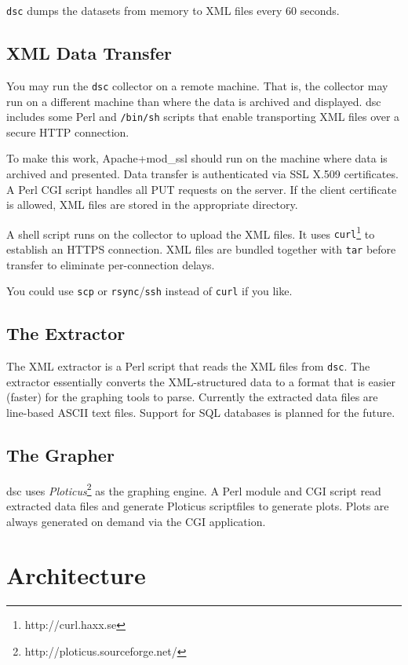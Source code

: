 \documentclass{report}
\def\dsc{{\sc dsc}}
\begin{document}
{\tt dsc\/} dumps the datasets from memory to XML files every 60 seconds.

\subsection{XML Data Transfer}

You may run the {\tt dsc\/} collector on a remote machine.  That
is, the collector may run on a different machine than where the
data is archived and displayed.  {\dsc} includes some Perl and {\tt /bin/sh}
scripts that enable transporting XML files over a secure HTTP
connection.

To make this work, Apache+mod\_ssl should run on the machine where data
is archived and presented.
Data transfer is authenticated via SSL X.509 certificates.  A Perl
CGI script handles all PUT requests on the server.  If the client
certificate is allowed, XML files are stored in the appropriate
directory.

A shell script runs on the collector to upload the XML files.  It
uses {\tt curl\/}\footnote{http://curl.haxx.se} to establish an
HTTPS connection.  XML files are bundled together with {\tt tar\/}
before transfer to eliminate per-connection delays.

You could use {\tt scp\/} or {\tt rsync\/}/{\tt ssh\/} instead of
{\tt curl\/} if you like.

\subsection{The Extractor}

The XML extractor is a Perl script that reads the XML files from
{\tt dsc\/}.  The extractor essentially converts the XML-structured
data to a format that is easier (faster) for the graphing tools to
parse.  Currently the extracted data files are line-based ASCII
text files.  Support for SQL databases is planned for the future.

\subsection{The Grapher}

{\dsc} uses {\em Ploticus\/}\footnote{http://ploticus.sourceforge.net/}
as the graphing engine.  A Perl module and CGI script read extracted
data files and generate Ploticus scriptfiles to generate plots.  Plots
are always generated on demand via the CGI application.


\section{Architecture}
\end{document}
